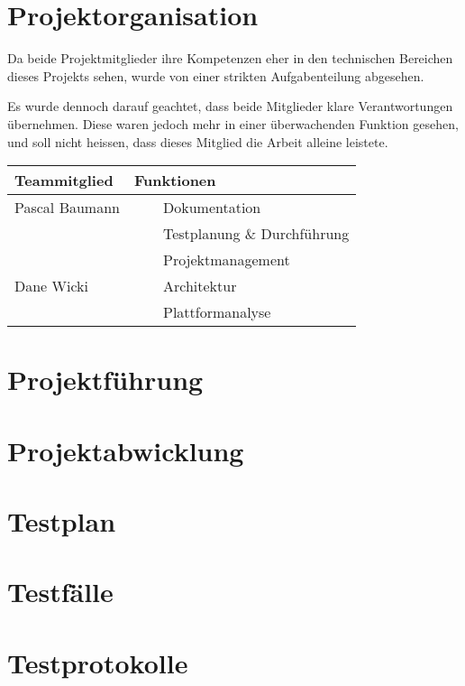 \documentclass[a4paper]{scrreprt}
\newcommand{\tabitem}{~~\llap{\textbullet}~~}
\begin{document}
\section{Projektorganisation}
Da beide Projektmitglieder ihre Kompetenzen eher in den technischen Bereichen dieses Projekts sehen, wurde von einer strikten Aufgabenteilung abgesehen.

Es wurde dennoch darauf geachtet, dass beide Mitglieder klare Verantwortungen übernehmen. Diese waren jedoch mehr in einer überwachenden Funktion gesehen, und soll nicht heissen, dass dieses Mitglied die Arbeit alleine leistete.

\vspace{1em}

\begin{tabularx}{\textwidth}{|X|X|}
	\hline
	\textbf{Teammitglied} & \textbf{Funktionen} \\
	\hline
	Pascal Baumann & \tabitem Dokumentation \\
	& \tabitem Testplanung \& Durchführung \\
	& \tabitem Projektmanagement \\
	\hline
	Dane Wicki & \tabitem Architektur \\
	& \tabitem Plattformanalyse \\
	\hline
\end{tabularx}

\section{Projektführung}

\section{Projektabwicklung}

\section{Testplan}

\section{Testfälle}

\section{Testprotokolle}


\appendix
\end{document}
